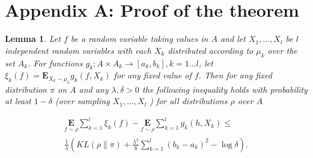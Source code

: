 \documentclass[letterpaper]{article} %
\newtheorem{lemma}{Lemma}
\begin{document}




  
 





\section{Appendix A: Proof of the theorem}


\begin{lemma} \cite{pentinaPACBayesianBoundLifelong2014}
 Let $f$ be a random variable taking values in $A$ and let $X_1, \ldots, X_l$ be $l$ independent random variables with each $X_k$ distributed according to $\mu_k$ over the set $A_k$. For functions $g_k: A \times A_k \rightarrow\left[a_k, b_k\right], k=1 \ldots l$, let $\xi_k(f)=\mathbf{E}_{X_k \sim \mu_k} g_k\left(f, X_k\right)$ for any fixed value of $f$. Then for any fixed distribution $\pi$ on $A$ and any $\lambda, \delta>0$ the following inequality holds with probability at least $1-\delta$ (over sampling $X_1, \ldots, X_l$ ) for all distributions $\rho$ over $A$

$$
\begin{gathered}
\underset{f \sim \rho}{\mathbf{E}} \sum_{k=1}^l \xi_k(f)-\underset{f \sim \rho}{\mathbf{E}} \sum_{k=1}^l g_k\left(h, X_k\right) \leq \\
\frac{1}{\lambda}\left(K L(\rho \| \pi)+\frac{\lambda^2}{8} \sum_{k=1}^l\left(b_k-a_k\right)^2-\log \delta\right) .
\end{gathered}
$$
\end{lemma}
\end{document}
